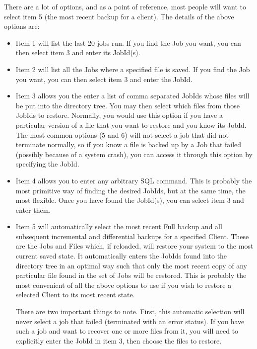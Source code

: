 There are a lot of options, and as a point of reference, most people will
want to select item 5 (the most recent backup for a client). The details
of the above options are:

\begin{itemize}
\item Item 1 will list the last 20 jobs run. If you find the Job you want,
   you can then select item 3 and enter its JobId(s).

\item Item 2 will list all the Jobs where a specified file is saved.  If you
   find the Job you want, you can then select item 3 and enter the JobId.

\item Item 3 allows you the enter a list of comma separated JobIds whose
   files will be put into the directory tree. You may then select which
   files from those JobIds to restore. Normally, you would use this option
   if you have a particular version of a file that you want to restore and
   you know its JobId. The most common options (5 and 6) will not select
   a job that did not terminate normally, so if you know a file is
   backed up by a Job that failed (possibly because of a system crash), you
   can access it through this option by specifying the JobId.

\item Item 4 allows you to enter any arbitrary SQL command.  This is
   probably the most primitive way of finding the desired JobIds, but at
   the same time, the most flexible.  Once you have found the JobId(s), you
   can select item 3 and enter them.

\item Item 5 will automatically select the most recent Full backup and all
   subsequent incremental and differential backups for a specified Client.
   These are the Jobs and Files which, if reloaded, will restore your
   system to the most current saved state.  It automatically enters the
   JobIds found into the directory tree in an optimal way such that only
   the most recent copy of any particular file found in the set of Jobs
   will be restored.  This is probably the most convenient of all the above
   options to use if you wish to restore a selected Client to its most
   recent state.

   There are two important things to note. First, this automatic selection
   will never select a job that failed (terminated with an error status).
   If you have such a job and want to recover one or more files from it,
   you will need to explicitly enter the JobId in item 3, then choose the
   files to restore.


\end{itemize}
